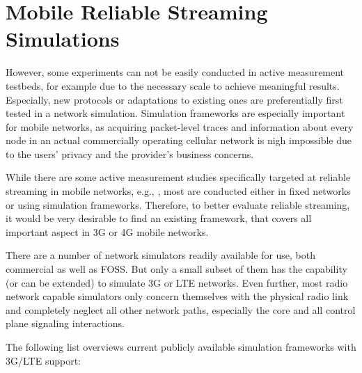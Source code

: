 \section{Mobile Reliable Streaming Simulations}
\label{c6:sec:mobilestreamingtestbed}

However, some experiments can not be easily conducted in active measurement testbeds, for example due to the necessary scale to achieve meaningful results. Especially, new protocols or adaptations to existing ones are preferentially first tested in a network simulation. Simulation frameworks are especially important for mobile networks, as acquiring packet-level traces and information about every node in an actual commercially operating cellular network is nigh impossible due to the users' privacy and the provider's business concerns.

While there are some active measurement studies specifically targeted at reliable streaming in mobile networks, e.g., \cite{Muller:2012:EDA:2151677.2151686}, most are conducted either in fixed networks or using simulation frameworks. Therefore, to better evaluate reliable streaming, it would be very desirable to find an existing framework, that covers all important aspect in 3G or 4G mobile networks.

There are a number of network simulators readily available for use, both commercial as well as \gls{FOSS}. But only a small subset of them has the capability (or can be extended) to simulate \gls{3G} or LTE networks. Even further, most radio network capable simulators only concern themselves with the physical radio link and completely neglect all other network paths, especially the core and all control plane signaling interactions. 

The following list overviews current publicly available simulation frameworks with \gls{3G}/\gls{LTE} support:

